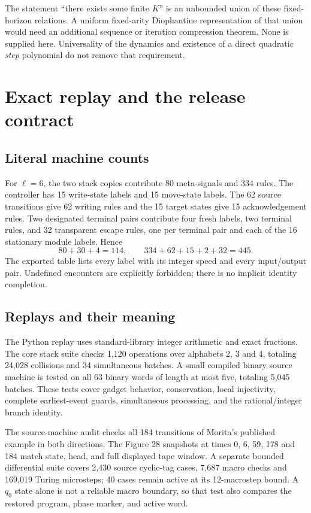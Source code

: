\documentclass[11pt,letterpaper]{article}
\numberwithin{equation}{section}
\theoremstyle{definition}
\theoremstyle{remark}
\begin{document}
The statement ``there exists some finite $K$'' is an unbounded union of these fixed-horizon relations. A uniform fixed-arity Diophantine representation of that union would need an additional sequence or iteration compression theorem. None is supplied here. Universality of the dynamics and existence of a direct quadratic \emph{step} polynomial do not remove that requirement.

\section{Exact replay and the release contract}\label{smc:cs:sec:replay}
\subsection{Literal machine counts}
For $\ell=6$, the two stack copies contribute 80 meta-signals and 334 rules. The controller has 15 write-state labels and 15 move-state labels. The 62 source transitions give 62 writing rules and the 15 target states give 15 acknowledgement rules. Two designated terminal pairs contribute four fresh labels, two terminal rules, and 32 transparent escape rules, one per terminal pair and each of the 16 stationary module labels. Hence
\[
 80+30+4=114,\qquad334+62+15+2+32=445.
\]
The exported table lists every label with its integer speed and every input/output pair. Undefined encounters are explicitly forbidden; there is no implicit identity completion.

\subsection{Replays and their meaning}
The Python replay uses standard-library integer arithmetic and exact fractions. The core stack suite checks 1,120 operations over alphabets 2, 3 and 4, totaling 24,028 collisions and 34 simultaneous batches. A small compiled binary source machine is tested on all 63 binary words of length at most five, totaling 5,045 batches. These tests cover gadget behavior, conservation, local injectivity, complete earliest-event guards, simultaneous processing, and the rational/integer branch identity.

The source-machine audit checks all 184 transitions of Morita's published example in both directions. The Figure 28 snapshots at times 0, 6, 59, 178 and 184 match state, head, and full displayed tape window. A separate bounded differential suite covers 2,430 source cyclic-tag cases, 7,687 macro checks and 169,019 Turing microsteps; 40 cases remain active at its 12-macrostep bound. A $q_0$ state alone is not a reliable macro boundary, so that test also compares the restored program, phase marker, and active word.
\end{document}
